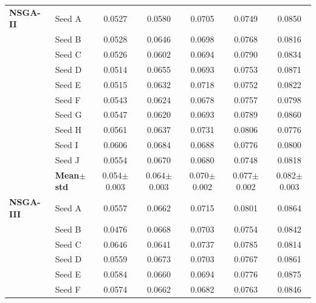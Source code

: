 \begin{table}[H]
{\begin{tabular}{@{}llccccc@{}}
\midrule
 \textbf{NSGA-II} & Seed A & {\small 0.0527} & {\small 0.0580} & {\small 0.0705} & {\small 0.0749} & {\small 0.0850} \\
  & Seed B & {\small 0.0528} & {\small 0.0646} & {\small 0.0698} & {\small 0.0768} & {\small 0.0816} \\
  & Seed C & {\small 0.0526} & {\small 0.0602} & {\small 0.0694} & {\small 0.0790} & {\small 0.0834} \\
  & Seed D & {\small 0.0514} & {\small 0.0655} & {\small 0.0693} & {\small 0.0753} & {\small 0.0871} \\
  & Seed E & {\small 0.0515} & {\small 0.0632} & {\small 0.0718} & {\small 0.0752} & {\small 0.0822} \\
  & Seed F & {\small 0.0543} & {\small 0.0624} & {\small 0.0678} & {\small 0.0757} & {\small 0.0798} \\
  & Seed G & {\small 0.0547} & {\small 0.0620} & {\small 0.0693} & {\small 0.0789} & {\small 0.0860} \\
  & Seed H & {\small 0.0561} & {\small 0.0637} & {\small 0.0731} & {\small 0.0806} & {\small 0.0776} \\
  & Seed I & {\small 0.0606} & {\small 0.0684} & {\small 0.0688} & {\small 0.0776} & {\small 0.0800} \\
  & Seed J & {\small 0.0554} & {\small 0.0670} & {\small 0.0680} & {\small 0.0748} & {\small 0.0818} \\
 & \textbf{Mean$\pm$std} & \cellcolor{ForestGreen!25}0.054$\pm$0.003 & \cellcolor{ForestGreen!25}0.064$\pm$0.003 & \cellcolor{ForestGreen!25}0.070$\pm$0.002 & \cellcolor{YellowGreen!30}0.077$\pm$0.002 & \cellcolor{YellowGreen!30}0.082$\pm$0.003 \\
\midrule
 \textbf{NSGA-III} & Seed A & {\small 0.0557} & {\small 0.0662} & {\small 0.0715} & {\small 0.0801} & {\small 0.0864} \\
  & Seed B & {\small 0.0476} & {\small 0.0668} & {\small 0.0703} & {\small 0.0754} & {\small 0.0842} \\
  & Seed C & {\small 0.0646} & {\small 0.0641} & {\small 0.0737} & {\small 0.0785} & {\small 0.0814} \\
  & Seed D & {\small 0.0559} & {\small 0.0673} & {\small 0.0703} & {\small 0.0767} & {\small 0.0861} \\
  & Seed E & {\small 0.0584} & {\small 0.0660} & {\small 0.0694} & {\small 0.0776} & {\small 0.0875} \\
  & Seed F & {\small 0.0574} & {\small 0.0662} & {\small 0.0682} & {\small 0.0763} & {\small 0.0846} \\

\end{tabular}}
\end{table}
